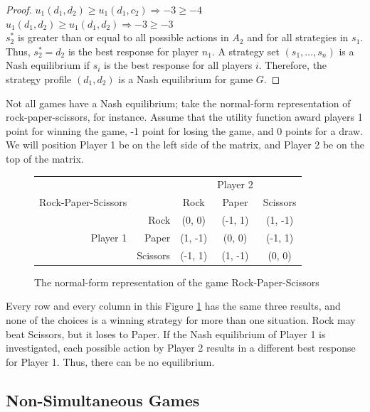 \begin{proof}
  $u_1(d_1, d_2)\ge u_1(d_1, c_2) \Rightarrow -3\ge -4$\\

  $u_1(d_1, d_2)\ge u_1(d_1, d_2) \Rightarrow -3\ge -3$\\

  $s^*_2$ is greater than or equal to all possible actions in $A_2$ and for all strategies in $s_1$. Thus, $s^*_2=d_2$ is the best response for player $n_1$. A strategy set $(s_1,\dots ,s_n)$ is a Nash equilibrium if $s_i$ is the best response for all players $i$. Therefore, the strategy profile $(d_1, d_2)$ is a Nash equilibrium for game $G$.
\end{proof}

Not all games have a Nash equilibrium; take the normal-form representation of rock-paper-scissors, for instance. Assume that the utility function award players 1 point for winning the game, -1 point for losing the game, and 0 points for a draw. We will position Player 1 be on the left side of the matrix, and Player 2 be on the top of the matrix.
\begin{figure}[H]
  \centering
  \begin{tabular}{r r | c | c | c |}
    &\multicolumn{1}{c}{}&\multicolumn{1}{c}{}&\multicolumn{1}{c}{Player 2}&\multicolumn{1}{c}{}\\
    Rock-Paper-Scissors &\multicolumn{1}{c}{}&\multicolumn{1}{c}{Rock}&\multicolumn{1}{c}{Paper}&\multicolumn{1}{c}{Scissors} \\ \cline{3-5}
    & Rock & (0, 0) & (-1, 1) & (1, -1) \\ \cline{3-5}
    Player 1 & Paper & (1, -1) & (0, 0) & (-1, 1) \\ \cline{3-5}
    & Scissors & (-1, 1) & (1, -1) & (0, 0) \\ \cline{3-5}
  \end{tabular}
  \caption{The normal-form representation of the game Rock-Paper-Scissors}
  \label{fig:RPS}
\end{figure}

Every row and every column in this Figure \ref{fig:RPS} has the same three results, and none of the choices is a winning strategy for more than one situation. Rock may beat Scissors, but it loses to Paper. If the Nash equilibrium of Player 1 is investigated, each possible action by Player 2 results in a different best response for Player 1. Thus, there can be no equilibrium.

\subsection{Non-Simultaneous Games}

